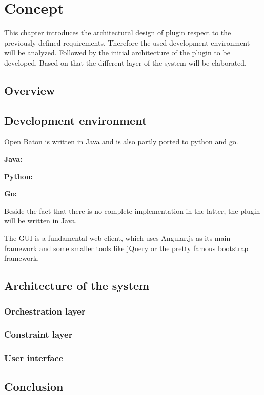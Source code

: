 \acresetall

\chapter{Concept}\label{chapter:concept}
This chapter introduces the architectural design of plugin respect to the previously defined requirements.
Therefore the used development environment will be analyzed.
Followed by the initial architecture of the plugin to be developed.
Based on that the different layer of the system will be elaborated.

\section{Overview}
\doit


\section{Development environment}
\doit

Open Baton is written in Java and is also partly ported to python and go.

\textbf{Java:}

\textbf{Python:}

\textbf{Go:}

Beside the fact that there is no complete implementation in the latter, the plugin will be written in Java.

The \ac{GUI} is a fundamental web client, which uses Angular.js as its main framework and some smaller tools like jQuery or the pretty famous bootstrap framework.


\section{Architecture of the system}
\doit


\subsection{Orchestration layer}
\doit

\subsection{Constraint layer}
\doit

\subsection{User interface}
\doit

\section{Conclusion}
\doit
